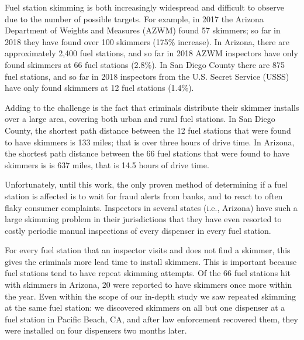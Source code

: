 Fuel station skimming is both increasingly widespread and difficult to observe
due to the number of possible targets.
%
For example, in 2017 the Arizona Department of Weights and Measures (AZWM)
found 57 skimmers; so far in 2018 they have found over 100 skimmers (175\%
increase).
%
In Arizona, there are approximately 2,400 fuel stations, and so far in 2018
AZWM inspectors have only found skimmers at 66 fuel stations (2.8\%).
%
%
In San Diego County there are 875 fuel stations, and so far in 2018 inspectors
from the U.S. Secret Service (USSS) have only found skimmers at 12 fuel stations
(1.4\%).

Adding to the challenge is the fact that criminals distribute their skimmer
installs over a large area, covering both urban and rural fuel stations.
%
In San Diego County, the shortest path distance between the 12 fuel stations
that were found to have skimmers is 133 miles; that is over three hours of
drive time.
%
In Arizona, the shortest path distance between the 66 fuel stations that were
found to have skimmers is is 637 miles, that is 14.5 hours of drive time.


Unfortunately, until this work, the only proven method of determining if a fuel
station is affected is to wait for fraud alerts from banks, and to react to
often flaky consumer complaints.
%
Inspectors in several states (i.e., Arizona) have such a large skimming problem
in their jurisdictions that they have even resorted to costly periodic manual
inspections of every dispenser in every fuel station.

For every fuel station that an inspector visits and does not find a skimmer,
this gives the criminals more lead time to install skimmers.
%
This is important because fuel stations tend to have repeat skimming attempts.
Of the 66 fuel stations hit with skimmers in Arizona, 20 were reported to have
skimmers once more within the year.
%
Even within the scope of our in-depth study we saw repeated skimming at the
same fuel station: we discovered skimmers on all but one dispenser at a fuel
station in Pacific Beach, CA, and after law enforcement recovered them, they
were installed on four dispensers two months later.
%


